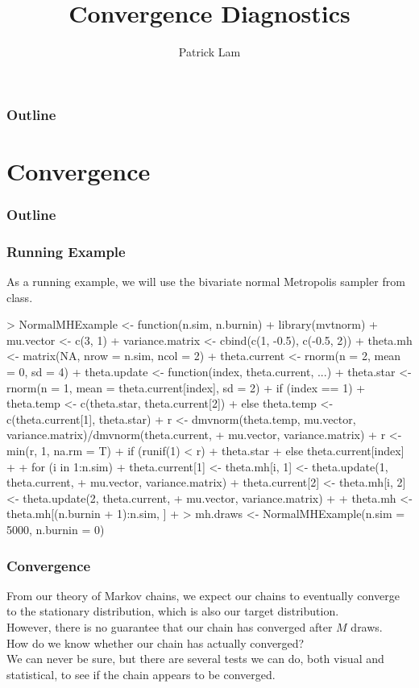 \documentclass{beamer}
\author{Patrick Lam}
\title{Convergence Diagnostics}
\date{}
\begin{document}
\newcommand{\red}{\textcolor{red}}
\newcommand{\blue}{\textcolor{blue}}
\newcommand{\purple}{\textcolor{purple}}

\frame{\titlepage}

\begin{frame}
\frametitle{Outline}
\tableofcontents
\end{frame}


\section{Convergence}

\begin{frame}
\frametitle{Outline}
\tableofcontents[currentsection]
\end{frame}


\begin{frame}[fragile]
\frametitle{Running Example}
\pause
As a running example, we will use the bivariate normal Metropolis
sampler from class.
\medskip
\pause
\tiny
\begin{Schunk}
\begin{Sinput}
> NormalMHExample <- function(n.sim, n.burnin) {
+     library(mvtnorm)
+     mu.vector <- c(3, 1)
+     variance.matrix <- cbind(c(1, -0.5), c(-0.5, 2))
+     theta.mh <- matrix(NA, nrow = n.sim, ncol = 2)
+     theta.current <- rnorm(n = 2, mean = 0, sd = 4)
+     theta.update <- function(index, theta.current, ...) {
+         theta.star <- rnorm(n = 1, mean = theta.current[index], sd = 2)
+         if (index == 1) 
+             theta.temp <- c(theta.star, theta.current[2])
+         else theta.temp <- c(theta.current[1], theta.star)
+         r <- dmvnorm(theta.temp, mu.vector, variance.matrix)/dmvnorm(theta.current, 
+             mu.vector, variance.matrix)
+         r <- min(r, 1, na.rm = T)
+         if (runif(1) < r) 
+             theta.star
+         else theta.current[index]
+     }
+     for (i in 1:n.sim) {
+         theta.current[1] <- theta.mh[i, 1] <- theta.update(1, theta.current, 
+             mu.vector, variance.matrix)
+         theta.current[2] <- theta.mh[i, 2] <- theta.update(2, theta.current, 
+             mu.vector, variance.matrix)
+     }
+     theta.mh <- theta.mh[(n.burnin + 1):n.sim, ]
+ }
> mh.draws <- NormalMHExample(n.sim = 5000, n.burnin = 0)
\end{Sinput}
\end{Schunk}
\normalsize
\end{frame}


\begin{frame}
\frametitle{Convergence}
\pause
From our theory of Markov chains, we expect our chains to eventually
converge to the stationary distribution, which is also our target
distribution. \\
\pause
\bigskip
However, there is no guarantee that our chain has converged after $M$ draws.\\
\pause
\bigskip
How do we know whether our chain has actually converged? \\
\pause
\bigskip
We can never be sure, but there are several tests we can do, both
visual and statistical, to see if the chain appears to be converged.
\end{frame}
\end{document}
